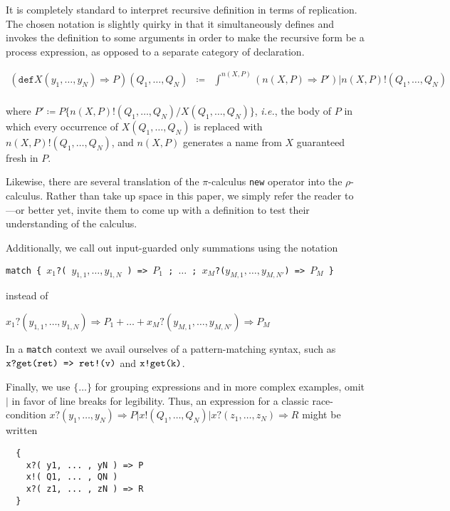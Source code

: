 \documentclass[]{amsart}
\newcommand{\id}[1]{\texttt{#1}}
\newcommand{\juxtap}{\mathbin{\id{|}}}
\newcommand{\binpar}[2]{#1 \juxtap #2}
\newcommand{\bangxp}[2]{\int^{#2} #1}
\newcommand{\defneqls}{\coloneqq}
\theoremstyle{definition}
\theoremstyle{remark}
\numberwithin{equation}{subsection}
\newcommand{\pic}{$\pi$-calculus}
\newcommand{\rhoc}{$\rho$-calculus}
\begin{document}
It is completely standard to interpret recursive definition in terms
of replication. The chosen notation is slightly quirky in that it
simultaneously defines and invokes the definition to some arguments
in order to make the recursive form be a process expression, as
opposed to a separate category of declaration.

\begin{eqnarray*}
  (\texttt{def} {X}{( y_1, \ldots, y_N )} \Rightarrow {P}){( Q_1, \ldots, Q_N )} & \defneqls & \binpar{\bangxp{(n( X, P ) \Rightarrow P')}{n( X, P )}}{n( X, P )!( Q_1, \ldots, Q_N )} \\  
\end{eqnarray*}

\noindent where $P' \defneqls P \{ n( X, P )!( Q_1, \ldots, Q_N )/ X( Q_1,
\ldots, Q_N )\}$, {\em i.e.}, the body of $P$ in which every occurrence of
$X( Q_1, \ldots, Q_N )$ is replaced with $n( X, P )!( Q_1, \ldots, Q_N
)$, and $n( X, P )$ generates a name from $X$ guaranteed fresh in $P$.

Likewise, there are several translation of the \pic\; {\tt new}
operator into the \rhoc. Rather than take up space in this paper, we
simply refer the reader to \cite{DBLP:journals/entcs/MeredithR05}---or
better yet, invite them to come up with a definition to test their
understanding of the calculus.

Additionally, we call out input-guarded only summations using the notation

{\tt match \{ $x_1$?( $y_{1,1}, \ldots, y_{1,N}$ ) => $P_1$ ; $\ldots$ ; $x_M$?($y_{M,1}, \ldots, y_{M,N'}$) => $P_M$ \}} 

\noindent instead of 

$x_1?( y_{1,1}, \ldots, y_{1,N} ) \Rightarrow P_1 + \ldots + x_M?( y_{M,1},\ldots, y_{M,N'} ) \Rightarrow P_M$

In a {\tt match} context we avail ourselves of a pattern-matching
syntax, such as $\mbox{\tt x?get(ret) => ret!(v)}$ and $\mbox{\tt x!get(k)}$.

Finally, we use $\{ \ldots \}$ for grouping expressions and in more complex examples, omit
$\binpar{}{}$ in favor of line breaks for legibility. Thus, an expression for a classic race-condition $\binpar{ x?( y_1, \ldots, y_N ) \Rightarrow P}{\binpar{x!( Q_1, \ldots, Q_N )}{ x?( z_1, \ldots, z_N ) \Rightarrow R}}$ might be written
\begin{verbatim}
  {
    x?( y1, ... , yN ) => P
    x!( Q1, ... , QN )
    x?( z1, ... , zN ) => R
  }
\end{verbatim}
\end{document}
